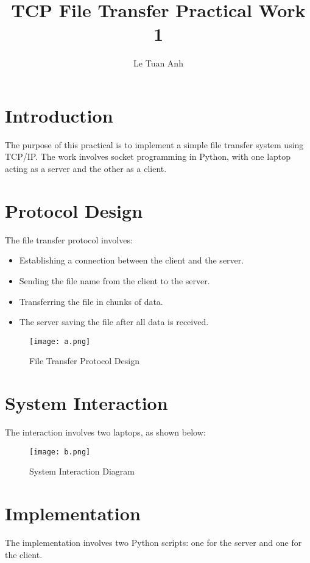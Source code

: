 \documentclass{article}
\title{TCP File Transfer Practical Work 1}
\author{Le Tuan Anh}
\date{}
\begin{document}
\maketitle

\section{Introduction}
The purpose of this practical is to implement a simple file transfer system using TCP/IP. The work involves socket programming in Python, with one laptop acting as a server and the other as a client.

\section{Protocol Design}
The file transfer protocol involves:
\begin{itemize}
    \item Establishing a connection between the client and the server.
    \item Sending the file name from the client to the server.
    \item Transferring the file in chunks of data.
    \item The server saving the file after all data is received.
\end{itemize}

\begin{figure}[h]
    \centering
    \texttt{[image: a.png]} 
    \caption{File Transfer Protocol Design}
    \label{fig:protocol-design}
\end{figure}

\section{System Interaction}
The interaction involves two laptops, as shown below:

\begin{figure}[h]
    \centering
    \texttt{[image: b.png]} 
    \caption{System Interaction Diagram}
    \label{fig:system-interaction}
\end{figure}

\section{Implementation}
The implementation involves two Python scripts: one for the server and one for the client.
\end{document}
